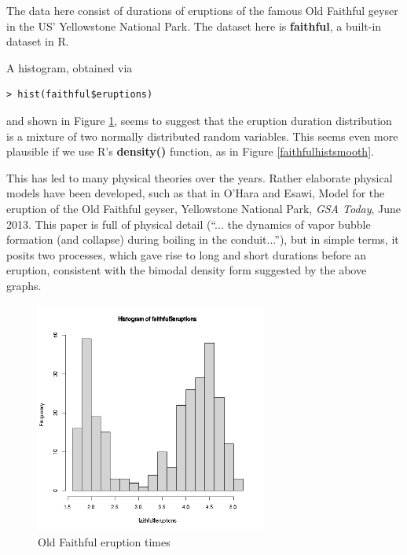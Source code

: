 \documentclass[11pt]{article}
\begin{document}
The data here consist of durations of eruptions of the famous
Old Faithful geyser in the US' Yellowstone National Park.  The dataset
here is \textbf{faithful}, a built-in dataset in R.

A histogram, obtained via 

\begin{lstlisting}
> hist(faithful$eruptions)
\end{lstlisting}

and shown in Figure \ref{faithfulhist}, seems to suggest that the
eruption duration distribution is a mixture of two normally distributed random
variables.  This seems even more plausible if we use R's 
\textbf{density()} function, as in Figure \ref{faithfulhistsmooth}.

This has led to many physical theories over the years.  Rather elaborate
physical models have been developed, such as that in O'Hara and Esawi,
Model for the eruption of the Old Faithful geyser, Yellowstone National
Park, \textit{GSA Today}, June 2013.  This paper is full of physical
detail (``... the dynamics of vapor bubble formation (and collapse)
during boiling in the conduit...''), but in simple terms, it posits two
processes, which gave rise to long and short durations before an
eruption, consistent with the bimodal density form suggested by the
above graphs.

\begin{figure}[tb]
\centerline{
\includegraphics[width=3.0in]{FaithfulDuration.png}
}
\caption{Old Faithful eruption times}
\label{faithfulhist}
\end{figure}
\end{document}
